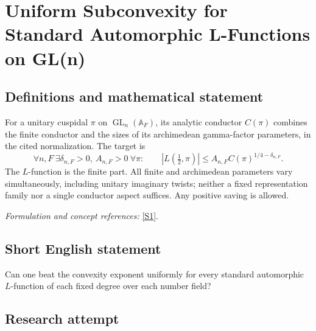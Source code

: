 \documentclass[11pt,a4paper]{article}
\newcommand{\A}{\mathbb{A}}
\newcommand{\sref}[2]{\hyperlink{source:#1:#2}{[S#2]}}
\newif\ifshowcatalogue
\newcommand{\cataloguescope}[1]{\ifshowcatalogue
 \paragraph{Exact scope in the supplied catalogue.}
 \begin{quote}\small #1\end{quote}\fi}
\numberwithin{equation}{section}
\begin{document}
\setcounter{section}{0}
\clearpage
\section*{\texorpdfstring{Uniform Subconvexity for Standard Automorphic L-Functions on GL(n)}{Uniform Subconvexity for Standard Automorphic L-Functions on GL(n)}}\label{statement}
\subsection{Definitions and mathematical statement}
For a unitary cuspidal $\pi$ on $\operatorname{GL}_n(\A_F)$, its analytic conductor $C(\pi)$ combines the finite conductor and the sizes of its archimedean gamma-factor parameters, in the cited normalization. The target is
\[
 \forall n,F\ \exists\delta_{n,F}>0,\ A_{n,F}>0\ \forall\pi:\qquad
 |L(\tfrac12,\pi)|\le A_{n,F}C(\pi)^{1/4-\delta_{n,F}}.
\]
The $L$-function is the finite part. All finite and archimedean parameters vary simultaneously, including unitary imaginary twists; neither a fixed representation family nor a single conductor aspect suffices. Any positive saving is allowed.
\par\smallskip\textit{Formulation and concept references:} \sref{statement}{1}.
\cataloguescope{For every integer n\ensuremath{\ge}1 and every number field F, there exist constants \ensuremath{\delta}(n,F)>0 and A(n,F)>0 such that |L(1/2,\ensuremath{\pi})|\ensuremath{\le}A(n,F) C(\ensuremath{\pi})\textasciicircum{}(1/4\ensuremath{-}\ensuremath{\delta}(n,F)) for every unitary cuspidal automorphic representation \ensuremath{\pi} of GL\_n(A\_F), where L(s,\ensuremath{\pi}) is the standard finite-part L-function and C(\ensuremath{\pi}) its analytic conductor. The bound must be uniform simultaneously in all finite and archimedean parameters of \ensuremath{\pi}; imaginary unitary twists are included. Any fixed positive exponent saving suffices; the optimal exponent is not requested.}
\subsection{Short English statement}
Can one beat the convexity exponent uniformly for every standard automorphic $L$-function of each fixed degree over each number field?
\subsection{Research attempt}
\end{document}
